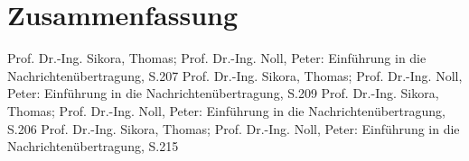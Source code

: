 
\section{Zusammenfassung}
\begin{quote}
	
\end{quote}



\begin{thebibliography}{999}
 Prof. Dr.-Ing. Sikora, Thomas; Prof. Dr.-Ing. Noll, Peter: Einführung in die
Nachrichtenübertragung, S.207
 Prof. Dr.-Ing. Sikora, Thomas; Prof. Dr.-Ing. Noll, Peter: Einführung in die
Nachrichtenübertragung, S.209
 Prof. Dr.-Ing. Sikora, Thomas; Prof. Dr.-Ing. Noll, Peter: Einführung in die
Nachrichtenübertragung, S.206
 Prof. Dr.-Ing. Sikora, Thomas; Prof. Dr.-Ing. Noll, Peter: Einführung in die
Nachrichtenübertragung, S.215



\end{thebibliography}


